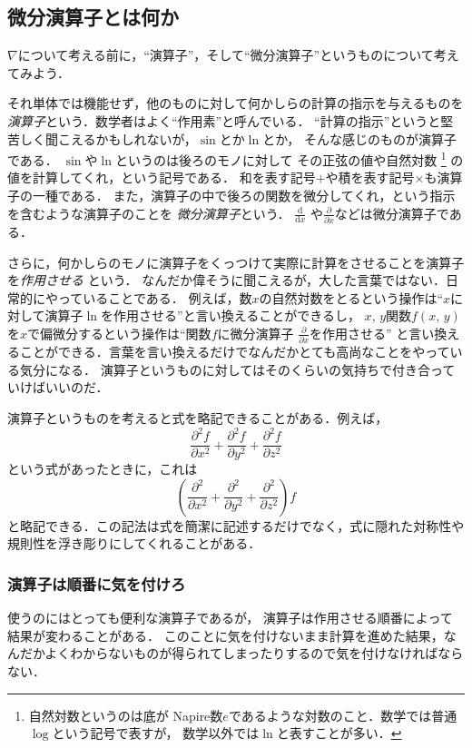 \subsection{微分演算子とは何か}
$\nabla$について考える前に，``演算子''，そして``微分演算子''というものについて考えてみよう．

それ単体では機能せず，他のものに対して何かしらの計算の指示を与えるものを
\emph{演算子}という．数学者はよく``作用素''と呼んでいる．
``計算の指示''というと堅苦しく聞こえるかもしれないが，$\sin$とか$\ln$とか，
そんな感じのものが演算子である．
$\sin$や$\ln$というのは後ろのモノに対して
その正弦の値や自然対数
\footnote{自然対数というのは底が
Napire数$e$であるような対数のこと．数学では普通$\log$という記号で表すが，
数学以外では$\ln$と表すことが多い．}
の値を計算してくれ，という記号である．
和を表す記号$+$や積を表す記号$\times$も演算子の一種である．
また，演算子の中で後ろの関数を微分してくれ，という指示を含むような演算子のことを
\emph{微分演算子}という．
$\displaystyle \frac{\mathrm{d}}{\mathrm{d}x}$
や$\displaystyle \frac{\partial}{\partial x}$などは微分演算子である．

さらに，何かしらのモノに演算子をくっつけて実際に計算をさせることを演算子を\emph{作用させる}
という．
なんだか偉そうに聞こえるが，大した言葉ではない．日常的にやっていることである．
例えば，数$x$の自然対数をとるという操作は``$x$に対して演算子$\ln$を作用させる''と言い換えることができるし，
$x, \, y$関数$f(x, \, y)$を$x$で偏微分するという操作は``関数$f$に微分演算子
$\displaystyle \frac{\partial}{\partial x}$を作用させる''
と言い換えることができる．言葉を言い換えるだけでなんだかとても高尚なことをやっている気分になる．
演算子というものに対してはそのくらいの気持ちで付き合っていけばいいのだ． 

演算子というものを考えると式を略記できることがある．例えば，
$$
\frac{\partial^2 f}{\partial x^2} + \frac{\partial^2 f}{\partial y^2} + \frac{\partial^2 f}{\partial z^2}
$$
という式があったときに，これは
$$
\left( \frac{\partial^2}{\partial x^2} + \frac{\partial^2}{\partial y^2} + \frac{\partial^2}{\partial z^2} \right) f
$$
と略記できる．この記法は式を簡潔に記述するだけでなく，式に隠れた対称性や規則性を浮き彫りにしてくれることがある．

\subsubsection{演算子は順番に気を付けろ}
使うのにはとっても便利な演算子であるが，
演算子は作用させる順番によって結果が変わることがある．
このことに気を付けないまま計算を進めた結果，なんだかよくわからないものが得られてしまったりするので気を付けなければならない．


